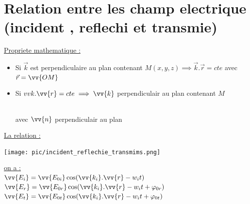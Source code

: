 \documentclass[12pt]{book}
\begin{document}
        \section{Relation entre les champ electrique (incident , reflechi et transmie)}
            \underline{Propriete mathematique :} 
            \begin{itemize}
                \item Si $\vec{k}$ est perpendiculaire au plan contenant $M(x,y,z) \implies \vec{k}.\vec{r} = cte$ avec $\vec{r}=\vv{OM}$
                \item Si $vv{k}.\vv{r} =cte \implies \vv{k} $ perpendiculair au plan contenant $M$ 
                \begin{center}
                     \\
                    avec $\vv{n}$ perpendiculair au plan
                \end{center}
            \end{itemize}
            \underline{La relation :} 
            \begin{center}
                \texttt{[image: pic/incident\_reflechie\_transmims.png]}
            \end{center}
            \underline{on a :} \\
                $ \vv{E_i} = \vv{E_{0i}}\cos(\vv{k_i}.\vv{r}-w_it) $ \\
                $ \vv{E_r} = \vv{E_{0r}}\cos(\vv{k_i}.\vv{r}-w_it + \varphi_{0r}) $ \\
                $ \vv{E_t} = \vv{E_{0t}}\cos(\vv{k_i}.\vv{r}-w_it + \varphi_{0t}) $ \\
                
\end{document}
